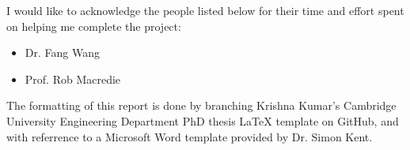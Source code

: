 
\begin{acknowledgements}      

I would like to acknowledge the people listed below for their time and effort spent on helping me complete the project:

\begin{itemize}
    \item Dr. Fang Wang
    \item Prof. Rob Macredie
\end{itemize}

The formatting of this report is done by branching Krishna Kumar's Cambridge University Engineering Department PhD thesis LaTeX template on GitHub, and with referrence to a Microsoft Word template provided by Dr. Simon Kent.

\end{acknowledgements}
